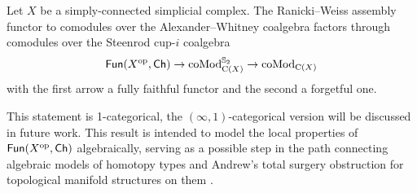 \begin{theorem*}
	Let $X$ be a simply-connected simplicial complex.
	The Ranicki--Weiss assembly functor to comodules over the Alexander--Whitney coalgebra factors through comodules over the Steenrod cup-$i$ coalgebra
	\[
	\mathsf{Fun}(X^{\mathrm{op}}, \mathsf{Ch}) \to \operatorname{coMod}^{\mathbb{S}_2}_{\operatorname{C}(X)} \to \operatorname{coMod}_{\operatorname{C}(X)}
	\]
	with the first arrow a fully faithful functor and the second a forgetful one.
\end{theorem*}

This statement is 1-categorical, the $(\infty,1)$-categorical version will be discussed in future work.
This result is intended to model the local properties of $\mathsf{Fun}(X^{\mathrm{op}},\mathsf{Ch})$ algebraically, serving as a possible step in the path connecting algebraic models of homotopy types \cite{quillen1969rational, sullivan1977infinitesimal,mandell2001padic} and Andrew's total surgery obstruction for topological manifold structures on them \cite{ranicki1979obstruction,ranicki1992topological,macko2013obstruction}.